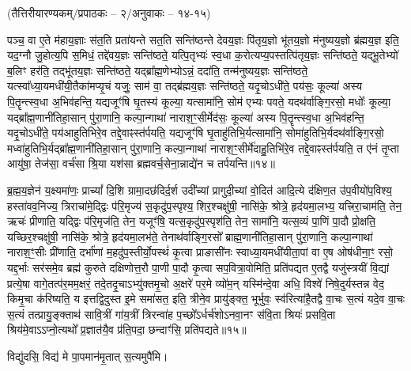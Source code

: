 \vspace{-1ex}
\centerline{\normalsize(तैत्तिरीयारण्यकम्/प्रपाठकः – २/अनुवाकः – १४-१५)}
{\normalsize
पञ्च॒ वा ए॒ते म॑हाय॒ज्ञाः स॑त॒ति प्रता॑यन्ते सत॒ति सन्ति॑ष्ठन्ते देवय॒ज्ञः पि॑तृय॒ज्ञो भू॑तय॒ज्ञो म॑नुष्यय॒ज्ञो ब्र॑ह्मय॒ज्ञ इति॒ यद॒ग्नौ जु॒होत्य॒पि स॒मिधं॒ तद्दे॑वय॒ज्ञः सन्ति॑ष्ठते॒ यत्पि॒तृभ्यः॑ स्व॒धा क॒रोत्यप्य॒पस्तत्पि॑तृय॒ज्ञः सन्ति॑ष्ठते॒ यद्भू॒तेभ्यो॑ ब॒लिꣳ हर॑ति॒ तद्भू॑तय॒ज्ञः सन्ति॑ष्ठते॒ यद्ब्रा᳚ह्म॒णेभ्योऽन्नं॒ ददा॑ति॒ तन्म॑नुष्यय॒ज्ञः सन्ति॑ष्ठते॒ यत्स्वा᳚ध्या॒यमधी॑यी॒तैका॑मप्यृ॒चं यजुः॒ साम॑ वा॒ तद्ब्र॑ह्मय॒ज्ञः सन्ति॑ष्ठते॒ यदृ॒चोऽधी॑ते॒ पय॑सः॒ कूल्या॑ अस्य पि॒तॄन्त्स्व॒धा अ॒भिव॑हन्ति॒ यद्यजूꣳ॑षि घृ॒तस्य॑ कूल्या॒ यत्सामा॑नि॒ सोम॑ एभ्यः पवते॒ यदथ॑र्वाङ्गि॒रसो॒ मधोः᳚ कूल्या॒ यद्ब्रा᳚ह्म॒णानी॑तिहा॒सान् पु॑रा॒णानि॒ कल्पा॒न्गाथा॑ नाराश॒ꣳ॒सीर्मेद॑सः॒ कूल्या॑ अस्य पि॒तॄन्त्स्व॒धा अ॒भिव॑हन्ति॒ यदृ॒चोऽधी॑ते॒ पय॑आहुतिभिरे॒व तद्दे॒वाꣴस्त॑र्पयति॒ यद्यजूꣳ॑षि घृ॒ताहु॑तिभि॒र्यत्सामा॑नि॒ सोमा॑हुतिभि॒र्यदथ॑र्वाङ्गि॒रसो॒ मध्वा॑\-हुतिभि॒र्यद्ब्रा᳚ह्म॒णानी॑तिहा॒सान् पु॑रा॒णानि॒ कल्पा॒न्गाथा॑ नाराश॒ꣳ॒सीर्मे॑दाहु॒तिभि॑रे॒व तद्दे॒वाꣴस्त॑र्पयति॒ त ए॑नं तृ॒प्ता आयु॑षा॒ तेज॑सा॒ वर्च॑सा श्रि॒या यश॑सा ब्रह्मवर्च॒सेना॒न्नाद्ये॑न च तर्पयन्ति॥१४॥

ब्र॒ह्म॒य॒ज्ञेन॑ य॒क्ष्यमा॑णः॒ प्राच्यां᳚ दि॒शि ग्रामा॒दछ॑दिर्द॒र्\mbox{}श उदी᳚च्यां प्रागुदी॒च्यां वो॒दित॑ आदि॒त्ये द॑क्षिण॒त उ॑प॒वीयो॑प॒विश्य॒ हस्ता॑वव॒निज्य॒ त्रिराचा॑मे॒द्द्विः प॑रि॒मृज्य॑ स॒कृदु॑प॒स्पृश्य॒ शिर॒श्चक्षु॑षी॒ नासि॑के॒ श्रोत्रे॒ हृद॑यमा॒लभ्य॒ यत्त्रिरा॒चाम॑ति॒ तेन॒ ऋचः॑ प्रीणाति॒ यद्द्विः प॑रि॒मृज॑ति॒ तेन॒ यजूꣳ॑षि॒ यत्स॒कृदु॑प॒स्पृश॑ति॒ तेन॒ सामा॑नि॒ यत्स॒व्यं पा॒णिं पा॒दौ प्रो॒क्षति॒ यच्छिर॒श्चक्षु॑षी॒ नासि॑के॒ श्रोत्रे॒ हृद॑यमा॒लभ॑ते॒ तेनाथ॑र्वाङ्गि॒रसो᳚ ब्राह्म॒णानी॑तिहा॒सान् पु॑रा॒णानि॒ कल्पा॒न्गाथा॑ नाराश॒ꣳ॒सीः प्री॑णाति॒ दर्भा॑णां म॒हदु॑प॒स्तीर्यो॒पस्थं॑ कृ॒त्वा प्राङासी॑नः स्वाध्या॒यमधी॑यीता॒पां वा ए॒ष ओष॑धीना॒ꣳ॒ रसो॒ यद्द॒र्भाः सर॑समे॒व ब्रह्म॑ कुरुते दक्षिणोत्त॒रौ पा॒णी पा॒दौ कृ॒त्वा सप॒वित्रा॒वोमिति॒ प्रति॑पद्यत ए॒तद्वै यजु॑स्त्रयीं वि॒द्यां प्रत्ये॒षा वागे॒तत्प॑र॒मम॒क्षरं॒ तदे॒तदृ॒चाऽभ्यु॑क्तमृ॒चो अ॒क्षरे॑ पर॒मे व्यो॑म॒न् यस्मि॑न्दे॒वा अधि॒ विश्वे॑ निषे॒दुर्यस्तन्न वेद॒ किमृ॒चा क॑रिष्यति॒ य इत्तद्वि॒दुस्त इ॒मे समा॑सत॒ इति॒ त्रीने॒व प्रायु॑ङ्क्त॒ भूर्भुवः॒ स्व॑रित्या॑है॒तद्वै वा॒चः स॒त्यं यदे॒व वा॒चः स॒त्यं तत्प्रायु॒ङ्क्ताथ॑ सावि॒त्रीं गा॑य॒त्रीं त्रिरन्वा॑ह प॒च्छो᳚ऽर्धर्च॑शोऽनवा॒नꣳ स॑वि॒ता श्रियः॑ प्रसवि॒ता श्रिय॑मे॒वाऽऽप्नो॒त्यथो᳚ प्र॒ज्ञात॑यै॒व प्र॑ति॒पदा॒ छन्दाꣳ॑सि॒ प्रति॑पद्यते॥१५॥


}

विद्यु॑दसि॒ विद्य॑ मे पा॒पमान॑मृ॒तात् स॒त्यमुपै॑मि।

